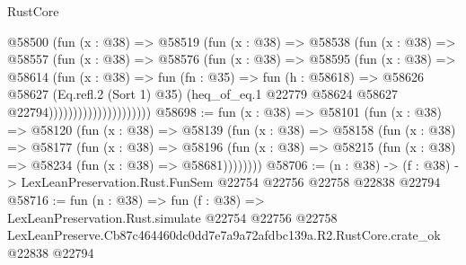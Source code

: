 \begin{lexlean}{RustCore}
\begin{coremodule}
                            @58500
                              (fun (x : @38) =>
                              @58519
                                (fun (x : @38) =>
                                @58538
                                  (fun (x : @38) =>
                                  @58557
                                    (fun (x : @38) =>
                                    @58576
                                      (fun (x : @38) =>
                                      @58595
                                        (fun (x : @38) =>
                                        @58614
                                          (fun (x : @38) =>
                                          fun (fn : @35) =>
                                          fun (h : @58618) =>
                                          @58626
                                            @58627
                                            (Eq.refl.{2} (Sort 1) @35)
                                            (heq_of_eq.{1}
                                              @22779
                                              @58624
                                              @58627
                                              @22794)))))))))))))))))))))
@58698 := fun (x : @38) =>
  @58101
    (fun (x : @38) =>
    @58120
      (fun (x : @38) =>
      @58139
        (fun (x : @38) =>
        @58158
          (fun (x : @38) =>
          @58177
            (fun (x : @38) =>
            @58196
              (fun (x : @38) => @58215 (fun (x : @38) => @58234 (fun (x : @38) => @58681))))))))
@58706 := (n : @38) ->
  (f : @38) -> LexLeanPreservation.Rust.FunSem @22754 @22756 @22758 @22838 @22794
@58716 := fun (n : @38) =>
  fun (f : @38) =>
  LexLeanPreservation.Rust.simulate
    @22754
    @22756
    @22758
    LexLeanPreserve.Cb87c464460dc0dd7e7a9a72afdbc139a.R2.RustCore.crate_ok
    @22838
    @22794
\end{coremodule}
\end{lexlean}
